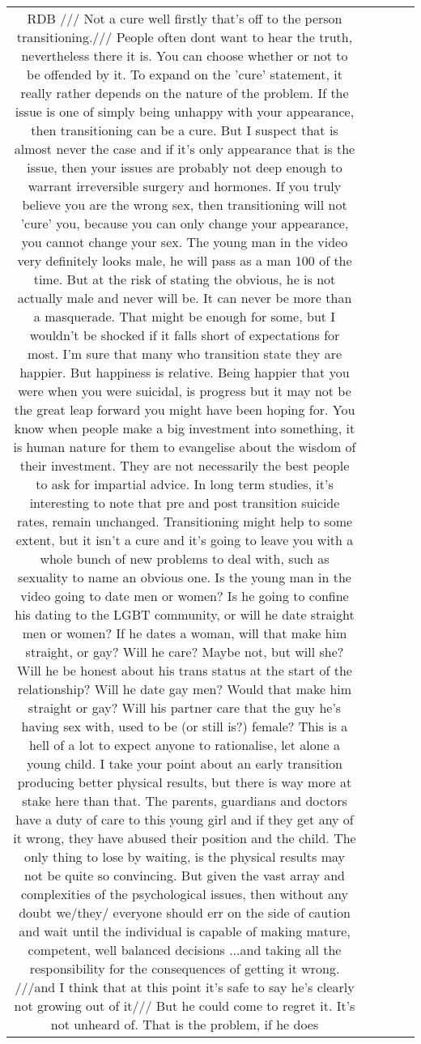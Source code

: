 \documentclass[11pt]{article}
\newlength\mylength
\begin{document}
\begin{center}
\begin{longtable}{|C{.40\mylength}|C{.30\mylength}|C{.15\mylength}|C{.15\mylength}|C{.15\mylength}|}
  RDB /// Not a cure  well firstly that's off to the person transitioning.///  People often dont want to hear the truth, nevertheless there it is. You can choose whether or not to be offended by it.   To expand on the 'cure' statement, it really rather depends on the nature of the problem. If the issue is one of simply being unhappy with your appearance, then transitioning can be a cure. But I suspect that is almost never the case and if it's only appearance that is the issue, then your issues are probably not deep enough to warrant irreversible surgery and hormones. If you truly believe you are the wrong sex, then transitioning will not 'cure' you, because you can only change your appearance, you cannot change your sex. The young man in the video very definitely looks male, he will pass as a man 100  of the time. But at the risk of stating the obvious, he is not actually male and never will be. It can never be more than a masquerade. That might be enough for some, but I wouldn't be shocked if it falls short of expectations for most.  I'm sure that many who transition state they are happier. But happiness is relative. Being happier that you were when you were suicidal, is progress but it may not be the great leap forward you might have been hoping for. You know when people make a big investment into something, it is human nature for them to evangelise about the wisdom of their investment. They are not necessarily the best people to ask for impartial advice. In long term studies, it's interesting to note that pre and post transition suicide rates, remain unchanged. Transitioning might help to some extent, but it isn't a cure and it's going to leave you with a whole bunch of new problems to deal with, such as sexuality to name an obvious one. Is the young man in the video going to date men or women? Is he going to confine his dating to the LGBT community, or will he date straight men or women? If he dates a woman, will that make him straight, or gay? Will he care? Maybe not, but will she? Will he be honest about his trans status at the start of the relationship? Will he date gay men? Would that make him straight or gay? Will his partner care that the guy he's having sex with, used to be (or still is?) female? This is a hell of a lot to expect anyone to rationalise, let alone a young child.  I take your point about an early transition producing better physical results, but there is way more at stake here than that. The parents, guardians and doctors have a duty of care to this young girl and if they get any of it wrong, they have abused their position and the child. The only thing to lose by waiting, is the physical results may not be quite so convincing. But given the vast array and complexities of the psychological issues, then without any doubt we/they/ everyone should err on the side of caution and wait until the individual is capable of making mature, competent, well balanced decisions ...and taking all the responsibility for the consequences of getting it wrong.  ///and I think that at this point it's safe to say he's clearly not growing out of it///  But he could come to regret it. It's not unheard of. That is the problem, if he does 
\end{longtable}
\end{center}
\end{document}
